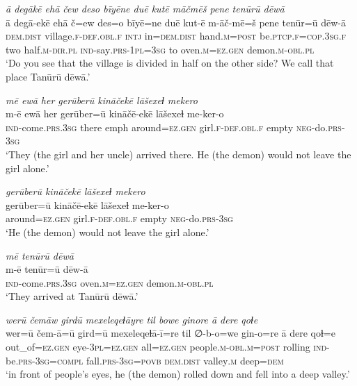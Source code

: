 \ea \label{ZP.74}
\textit{ā degākē ehā čew deso bīyēne duē kutē māčmēš pene tenūrū dēwā} \\ 
\gll ā degā-ekē ehā č=ew des=o bīyē=ne duē kut-ē m-āč-mē=š pene tenūr=ū dēw-ā \\ 
 \textsc{dem.dist} village\textsc{.f}\textsc{-def}\textsc{.obl}\textsc{.f} \textsc{intj} in=\textsc{dem.dist} hand\textsc{.m}\textsc{=\textsc{post}} be\textsc{.ptcp}\textsc{.f}\textsc{=cop}\textsc{.3sg}\textsc{.f} two half\textsc{.m}\textsc{-dir}\textsc{.pl} \textsc{ind-}say\textsc{.prs}\textsc{-1pl}\textsc{=3sg} to oven\textsc{.m}\textsc{\textsc{=ez.gen}} demon\textsc{.m}\textsc{-obl}\textsc{.pl} \\ 
\glt `Do you see that the village is divided in half on the other side? We call that place Tanūrū dēwā.'
\z 
 
\ea \label{ZP.75}
\textit{mē ewā her gerūberū kināčekē lāšexeɫ mekero} \\ 
\gll m-ē ewā her gerūber=ū kināčē-ekē lāšexeɫ me-ker-o \\ 
 \textsc{ind-}come\textsc{.prs}\textsc{.3sg} there emph around\textsc{\textsc{=ez.gen}} girl\textsc{.f}\textsc{-def}\textsc{.obl}\textsc{.f} empty \textsc{neg-}do\textsc{.prs}\textsc{-3sg} \\ 
\glt `They (the girl and her uncle) arrived there. He (the demon) would not leave the girl alone.'
\z 
 
\ea \label{ZP.76}
\textit{gerūberū kināčekē lāšexeɫ mekero} \\ 
\gll gerūber=ū kināčē-ekē lāšexeɫ me-ker-o \\ 
 around\textsc{\textsc{=ez.gen}} girl\textsc{.f}\textsc{-def}\textsc{.obl}\textsc{.f} empty \textsc{neg-}do\textsc{.prs}\textsc{-3sg} \\ 
\glt `He (the demon) would not leave the girl alone.'
\z 
 
\ea \label{ZP.77}
\textit{mē tenūrū dēwā} \\ 
\gll m-ē tenūr=ū dēw-ā \\ 
 \textsc{ind-}come\textsc{.prs}\textsc{.3sg} oven\textsc{.m}\textsc{\textsc{=ez.gen}} demon\textsc{.m}\textsc{-obl}\textsc{.pl} \\ 
\glt `They arrived at Tanūrū dēwā.'
\z 
 
\ea \label{ZP.80}
\textit{werū čemāw girdū mexeleqeɫāyre til bowe ginore ā dere qoɫe} \\ 
\gll wer=ū čem-ā=ū gird=ū mexeleqeɫā-ī=re til ∅-b-o=we gin-o=re ā dere qoɫ=e \\ 
 out\_of\textsc{\textsc{=ez.gen}} eye\textsc{-3pl}\textsc{\textsc{=ez.gen}} all\textsc{\textsc{=ez.gen}} people\textsc{.m}\textsc{-obl}\textsc{.m}\textsc{=\textsc{post}} rolling \textsc{ind-}be\textsc{.prs}\textsc{-3sg}\textsc{=compl} fall\textsc{.prs}\textsc{-3sg}\textsc{=\textsc{povb}} \textsc{dem.dist} valley\textsc{.m} deep\textsc{=dem} \\ 
\glt `in front of people’s eyes, he (the demon) rolled down and fell into a deep valley.'
\z 
 
